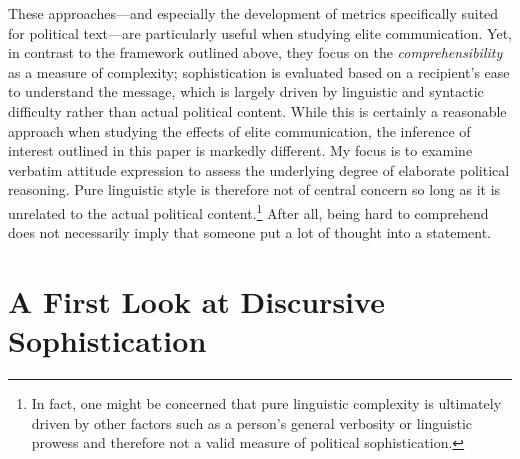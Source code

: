 These approaches---and especially the development of metrics specifically suited for political text---are particularly useful when studying elite communication. Yet, in contrast to the framework outlined above, they focus on the \textit{comprehensibility} as a measure of complexity; sophistication is evaluated based on a recipient's ease to understand the message, which is largely driven by linguistic and syntactic difficulty rather than actual political content. While this is certainly a reasonable approach when studying the effects of elite communication, the inference of interest outlined in this paper is markedly different. My focus is to examine verbatim attitude expression to assess the underlying degree of elaborate political reasoning. Pure linguistic style is therefore not of central concern so long as it is unrelated to the actual political content.\footnote{In fact, one might be concerned that pure linguistic complexity is ultimately driven by other factors such as a person's general verbosity or linguistic prowess and therefore not a valid measure of political sophistication.} After all, being hard to comprehend does not necessarily imply that someone put a lot of thought into a statement.



\section*{A First Look at Discursive Sophistication}

